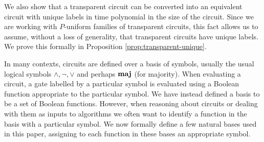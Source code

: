 \documentclass[../paper.tex]{subfiles}
\begin{document}
We also show that a transparent circuit can be converted into an equivalent
circuit with unique labels in time polynomial in the size of the circuit. Since
we are working with $P$-uniform families of transparent circuits, this fact
allows us to assume, without a loss of generality, that transparent circuits
have unique labels. We prove this formally in Proposition
\ref{prop:transparent-unique}.





In many contexts, circuits are defined over a basis of symbols, usually the
usual logical symbols $\land, \neg, \lor$ and perhaps $\text{\textbf{maj}}$ (for majority).
When evaluating a circuit, a gate labelled by a particular symbol is evaluated
using a Boolean function appropriate to the particular symbol. We have instead
defined a basis to be a set of Boolean functions. However, when reasoning about
circuits or dealing with them as inputs to algorithms we often want to identify
a function in the basis with a particular symbol. We now formally define a few
natural bases used in this paper, assigning to each function in these bases an
appropriate symbol.
\end{document}
